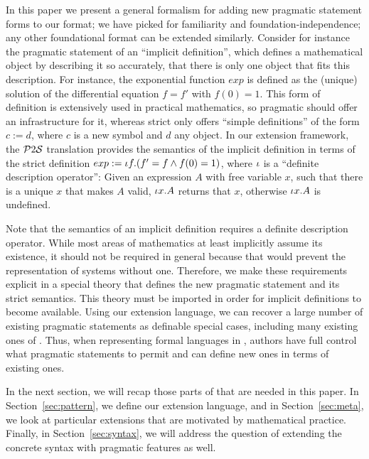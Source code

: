 In this paper we present a general formalism for adding new pragmatic statement forms to
our \omdoc format; we have picked \omdoc for familiarity and foundation-independence; any
other foundational format can be extended similarly. Consider for instance the pragmatic
statement of an ``implicit definition'', which defines a mathematical object by describing
it so accurately, that there is only one object that fits this description. For instance,
the exponential function $exp$ is defined as the (unique) solution of the differential
equation $f=f'$ with $f(0)=1$. This form of definition is extensively used in practical
mathematics, so pragmatic {\omdoc} should offer an infrastructure for it, whereas strict
{\omdoc} only offers ``simple definitions'' of the form $c:=d$, where $c$ is a new symbol
and $d$ any object.  In our extension framework, the $\mathcal{P}2\mathcal{S}$ translation provides the
semantics of the implicit definition in terms of the strict definition $exp:=\iota
f.(f'=f\wedge f(0)=1)$, where $\iota$ is a ``definite description operator'': Given an
expression $A$ with free variable $x$, such that there is a unique $x$ that makes $A$
valid, $\iota x.A$ returns that $x$, otherwise $\iota x.A$ is undefined.

Note that the semantics of an implicit definition requires a definite description operator.
While most areas of mathematics at least implicitly assume its existence, it should not be required in general because that would prevent the representation of systems without one.
Therefore, we make these requirements explicit in a special theory that defines the new pragmatic statement and its strict semantics. This theory must be imported in order for implicit definitions to become available.
Using our extension language, we can recover a large number of existing pragmatic statements as definable special cases, including many existing ones of {\omdoc}.
Thus, when representing formal languages in {\omdoc}, authors have full control what pragmatic statements to permit and can define new ones in terms of existing ones.
\medskip

In the next section, we will recap those parts of \omdoc that are
needed in this paper. In Section~\ref{sec:pattern}, 
we define our extension language, and in Section~\ref{sec:meta}, we look at particular extensions that are motivated by mathematical practice. Finally, in Section~\ref{sec:syntax}, we will address the question
of extending the concrete syntax with pragmatic features as well.




